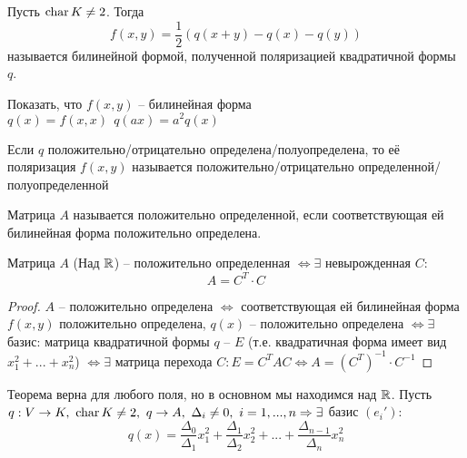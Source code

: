 \begin{Def} 
	Пусть $\operatorname{char} K \neq 2$. Тогда
	\[f(x,y) = \frac{1}{2} (q(x+y) - q(x) - q(y))\] 
	называется билинейной формой, полученной поляризацией квадратичной формы $q$.
\end{Def} 

\begin{Ex}
	Показать, что $f(x, y)$ -- билинейная форма\\
	$q(x) = f(x,x) \ \ q(ax) = a^2 q(x)$
\end{Ex}

\begin{Def} 
	Если $q$ положительно/отрицательно определена/полуопределена, то её поляризация $f(x, y)$ называется положительно/отрицательно определенной/полуопределенной 
\end{Def} 

\begin{Def}
	Матрица $A$ называется положительно определенной, если соответствующая ей билинейная форма положительно определена. 
\end{Def}

\begin{Thm} 
	Матрица $A$ (Над $\mathbb{R}$) -- положительно определенная $\Leftrightarrow \exists$ невырожденная $C:$ 
	\[A = C^T \cdot C\]
\end{Thm} 

\begin{proof}
	$A$ -- положительно определена $\Leftrightarrow$ соответствующая ей билинейная форма $f(x,y)$ положительно определена,  $q(x)$ -- положительно определена
	$\Leftrightarrow \exists$ базис: матрица квадратичной формы $q$ -- $E$ (т.е. квадратичная форма имеет вид $x^2_1 + ... + x^2_n$) $\Leftrightarrow \exists$ матрица перехода $C: E = C^TAC \Leftrightarrow A = (C^T)^{-1} \cdot C^{-1}$ 
\end{proof}

\begin{Thm}[Якоби] 
	Теорема верна для любого поля, но в основном мы находимся над $\mathbb{R}$.
	Пусть $q: V \to K, \ \operatorname{char} K \neq 2, \ q \to A, \ \Delta_i \neq 0, \ i = 1, ..., n  \Rightarrow \exists$ базис $(e_i'):$
	\[q(x) = \frac{\Delta_0}{\Delta_1} x_1^2 + \frac{\Delta_1}{\Delta_2} x_2^2 + ... + \frac{\Delta_{n-1}}{\Delta_n} x^2_n\]
\end{Thm} 


